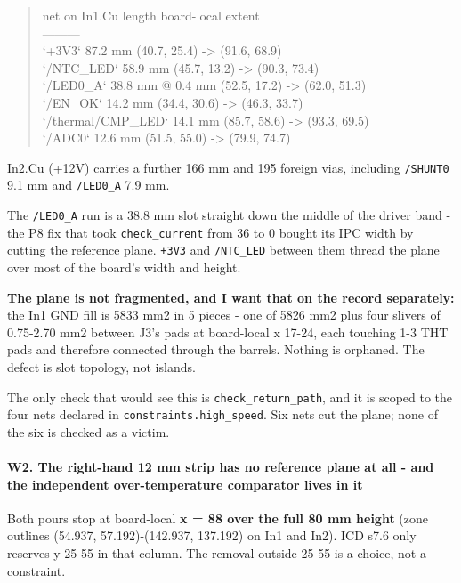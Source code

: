 \documentclass[11pt,a4paper]{article}
\begin{document}
\begin{quote}\small\ttfamily\raggedright
\textbar{} net on In1.Cu \textbar{} length \textbar{} board-local extent \textbar{}\\
\textbar{}---\textbar{}---\textbar{}---\textbar{}\\
\textbar{} `+3V3` \textbar{} 87.2 mm \textbar{} (40.7, 25.4) -\textgreater{} (91.6, 68.9) \textbar{}\\
\textbar{} `/NTC\_LED` \textbar{} 58.9 mm \textbar{} (45.7, 13.2) -\textgreater{} (90.3, 73.4) \textbar{}\\
\textbar{} `/LED0\_A` \textbar{} 38.8 mm @ 0.4 mm \textbar{} (52.5, 17.2) -\textgreater{} (62.0, 51.3) \textbar{}\\
\textbar{} `/EN\_OK` \textbar{} 14.2 mm \textbar{} (34.4, 30.6) -\textgreater{} (46.3, 33.7) \textbar{}\\
\textbar{} `/thermal/CMP\_LED` \textbar{} 14.1 mm \textbar{} (85.7, 58.6) -\textgreater{} (93.3, 69.5) \textbar{}\\
\textbar{} `/ADC0` \textbar{} 12.6 mm \textbar{} (51.5, 55.0) -\textgreater{} (79.9, 74.7) \textbar{}
\end{quote}
In2.Cu (+12V) carries a further 166 mm and 195 foreign vias, including \texttt{/SHUNT0} 9.1 mm and \texttt{/LED0\_A} 7.9 mm.

The \texttt{/LED0\_A} run is a 38.8 mm slot straight down the middle of the driver band - the P8 fix that took \texttt{check\_current} from 36 to 0 bought its IPC width by cutting the reference plane. \texttt{+3V3} and \texttt{/NTC\_LED} between them thread the plane over most of the board's width and height.

\textbf{The plane is not fragmented, and I want that on the record separately:} the In1 GND fill is 5833 mm2 in 5 pieces - one of 5826 mm2 plus four slivers of 0.75-2.70 mm2 between J3's pads at board-local x 17-24, each touching 1-3 THT pads and therefore connected through the barrels. Nothing is orphaned. The defect is slot topology, not islands.

The only check that would see this is \texttt{check\_return\_path}, and it is scoped to the four nets declared in \texttt{constraints.high\_speed}. Six nets cut the plane; none of the six is checked as a victim.

\paragraph*{W2. The right-hand 12 mm strip has no reference plane at all - and the independent over-temperature comparator lives in it}
Both pours stop at board-local \textbf{x = 88 over the full 80 mm height} (zone outlines (54.937, 57.192)-(142.937, 137.192) on In1 and In2). ICD s7.6 only reserves y 25-55 in that column. The removal outside 25-55 is a choice, not a constraint.
\end{document}
